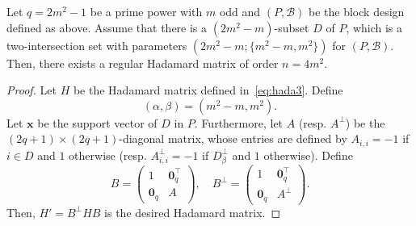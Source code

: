 \documentclass[ALCO,ThmDefs,Unicode]{cedram}
\newcommand*\tra{\top}
\newcommand*{\bfx}{\mathbf{x}}
\newcommand*{\bfo}{\mathbf{0}}
\begin{document}
\begin{prop}\label{prop:const5}
Let $q=2m^2-1$ be a prime power with $m$ odd and $(P,{\mathcal B})$ be the block design defined as above. Assume that there is a $(2m^2-m)$-subset $D$ of $P$, which is a two-intersection set with parameters $(2m^2-m;\{m^2-m,m^2\})$ for $(P,{\mathcal B})$. Then, there exists a regular Hadamard matrix of order $n=4m^2$.
\end{prop}
\begin{proof}
Let $H$ be the Hadamard matrix defined in~\eqref{eq:hada3}. Define
\[
(\alpha,\beta)=(m^2-m,m^2).
\]
Let $\bfx$ be the support vector of $D$ in $P$. Furthermore, let $A$ (resp. $A^{\perp}$) be the $(2q+1)\times (2q+1)$-diagonal matrix, whose entries are defined by $A_{i,i}=-1$ if $i\in D$ and $1$ otherwise (resp. $A^\perp_{i,i}=-1$ if $D_{\beta}^\perp$ and $1$ otherwise). Define
\[
B=
\begin{pmatrix} 1 & \bfo_q^\tra \\
\bfo_q & A
\end{pmatrix}, \quad B^\perp=
\begin{pmatrix} 1 & \bfo_q^\tra \\
\bfo_q & A^\perp
\end{pmatrix}.
\]
Then, $H'=B^\perp H B$ is the desired Hadamard matrix.


\end{proof}
\end{document}
